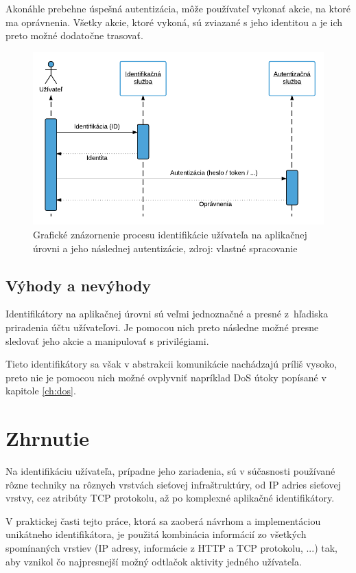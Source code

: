 \documentclass[
  printed, %
  table,   %
  lof,     %
  nolot,   %
  nocover
]{fithesis3}
\begin{document}
Akonáhle prebehne úspešná autentizácia, môže používateľ vykonať akcie, na ktoré
ma oprávnenia. Všetky akcie, ktoré vykoná, sú zviazané s jeho identitou a je ich
preto možné dodatočne trasovať.

\begin{figure}[h]
  \centering
    \includegraphics[width=.94\textwidth]{images/tech-app.png}
  \caption{Grafické znázornenie procesu identifikácie užívateľa na aplikačnej
  úrovni a jeho následnej autentizácie, zdroj: vlastné spracovanie}
  \label{fig:tech-app}
\end{figure}

\subsection{Výhody a nevýhody}
Identifikátory na aplikačnej úrovni sú veľmi jednoznačné a presné z~hľadiska
priradenia účtu užívateľovi. Je pomocou nich preto následne možné presne
sledovať jeho akcie a manipulovať s privilégiami.

Tieto identifikátory sa však v abstrakcii komunikácie nachádzajú príliš vysoko,
preto nie je pomocou nich možné ovplyvniť napríklad DoS útoky popísané v
kapitole \ref{ch:dos}.

\section{Zhrnutie}
Na identifikáciu užívateľa, prípadne jeho zariadenia, sú v súčasnosti
používané rôzne techniky na rôznych vrstvách sieťovej infraštruktúry, od IP
adries sieťovej vrstvy, cez atribúty TCP protokolu, až po komplexné aplikačné
identifikátory. 

V praktickej časti tejto práce, ktorá sa zaoberá návrhom a implementáciou
unikátneho identifikátora, je použitá kombinácia informácií zo všetkých
spomínaných vrstiev (IP adresy, informácie z HTTP a TCP protokolu, ...) tak,
aby vznikol čo najpresnejší možný odtlačok aktivity jedného užívateľa.
\end{document}
